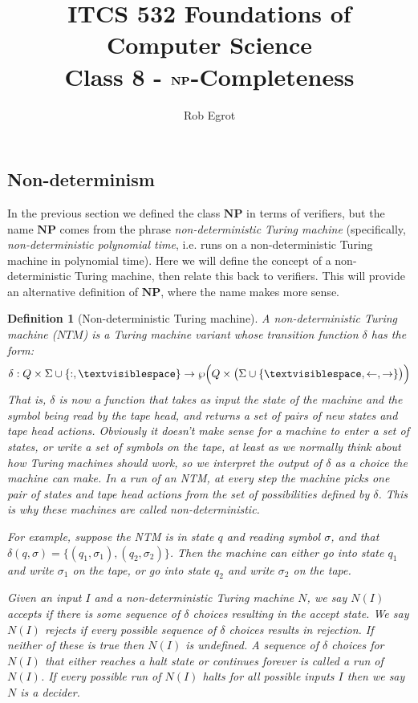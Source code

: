 \documentclass{article}
\title{ITCS 532 Foundations of Computer Science\\
Class 8 - $\NP$-Completeness}
\author{Rob Egrot}
\date{}
\theoremstyle{plain}
\newtheorem{definition}[theorem]{Definition}{\bfseries}{\upshape}
\theoremstyle{definition}
\newcommand{\tvs}{\textvisiblespace}
\newcommand{\ra}{\rightarrow}
\newcommand{\la}{\leftarrow}
\newcommand{\NP}{\mathbf{NP}}
\begin{document}
\maketitle
\subsection{Non-determinism}
In the previous section we defined the class $\NP$ in terms of verifiers, but the name $\NP$ comes from the phrase \emph{non-deterministic Turing machine} (specifically, \emph{non-deterministic polynomial time}, i.e. runs on a non-deterministic Turing machine in polynomial time). Here we will define the concept of a non-deterministic Turing machine, then relate this back to verifiers. This will provide an alternative definition of $\NP$, where the name makes more sense.
\begin{definition}[Non-deterministic Turing machine]
A non-deterministic Turing machine ($NTM$) is a Turing machine variant whose transition function $\delta$ has the form:
\[\delta:Q\times\Sigma\cup\{:,\tvs\}\to\wp\Big(Q\times \big(\Sigma\cup\{\tvs,\la,\ra\}\big)\Big)\]
That is, $\delta$ is now a function that takes as input the state of the machine and the symbol being read by the tape head, and returns a \emph{set} of pairs of new states and tape head actions. Obviously it doesn't make sense for a machine to enter a set of states, or write a set of symbols on the tape, at least as we normally think about how Turing machines should work, so we interpret the output of $\delta$ as a \emph{choice} the machine can make. In a run of an NTM, at every step the machine picks one pair of states and tape head actions from the set of possibilities defined by $\delta$. This is why these machines are called non-deterministic. 

For example, suppose the NTM is in state $q$ and reading symbol $\sigma$, and that $\delta(q,\sigma)=\{(q_1,\sigma_1),(q_2,\sigma_2)\}$. Then the machine can either go into state $q_1$ and write $\sigma_1$ on the tape, or go into state $q_2$ and write $\sigma_2$ on the tape.  

Given an input $I$ and a non-deterministic Turing machine $N$, we say $N(I)$ \emph{accepts} if there is some sequence of $\delta$ choices resulting in the accept state. We say $N(I)$ \emph{rejects} if every possible sequence of $\delta$ choices results in rejection. If neither of these is true then $N(I)$ is undefined. A sequence of $\delta$ choices for $N(I)$ that either reaches a halt state or continues forever is called a \emph{run} of $N(I)$. If every possible run of $N(I)$ halts for all possible inputs $I$ then we say $N$ is a \emph{decider}.


\end{definition}
\end{document}
